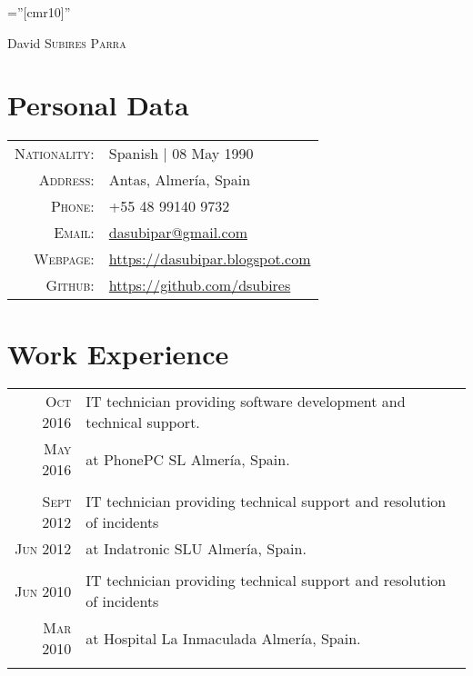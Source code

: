 \documentclass[a4paper,10pt]{article}
\begin{document}
\pagestyle{empty} %

\font\fb=''[cmr10]'' %

\par{\centering
		{\Huge David \textsc{Subires Parra}
	}\bigskip\par}

\section*{Personal Data}

\begin{tabular}{rp{12cm}}
    \textsc{Nationality:} & Spanish | 08 May 1990 \\
    \textsc{Address:}     & Antas, Almería, Spain \\
    \textsc{Phone:}       & +55 48 99140 9732 \\
    \textsc{Email:}       & \href {mailto:dasubipar@gmail.com}{dasubipar@gmail.com} \\
    \textsc{Webpage:}     & \url {https://dasubipar.blogspot.com} \\
    \textsc{Github:}      & \url{https://github.com/dsubires}
\end{tabular}

\section*{Work Experience}
\begin{tabular}{r|p{11cm}}

\textsc{Oct} 2016 & IT technician providing software development and technical support.\\\textsc{May 2016} & at PhonePC SL Almería, Spain. \normalsize \\\multicolumn{2}{c}{} \\

\textsc{Sept} 2012 & IT technician providing technical support and resolution of incidents\\\textsc{Jun 2012} & at Indatronic SLU Almería, Spain. \normalsize \\\multicolumn{2}{c}{} \\

\textsc{Jun} 2010 & IT technician providing technical support and resolution of incidents\\\textsc{Mar 2010} & at Hospital La Inmaculada Almería, Spain. \normalsize \\\multicolumn{2}{c}{} \\


\end{tabular}
\end{document}

